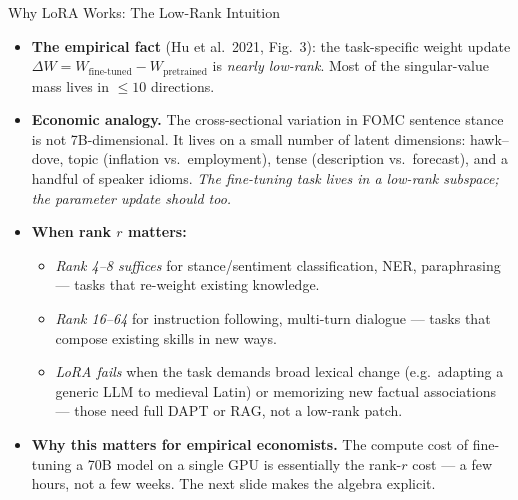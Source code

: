 \begin{frame}{Why LoRA Works: The Low-Rank Intuition}
\begin{itemize}
\item \textbf{The empirical fact} (Hu et al.\ 2021, Fig.\ 3): the task-specific weight update $\Delta W = W_{\text{fine-tuned}} - W_{\text{pretrained}}$ is \emph{nearly low-rank}. Most of the singular-value mass lives in $\le 10$ directions.

\medskip
\item \textbf{Economic analogy.} The cross-sectional variation in FOMC sentence stance is not 7B-dimensional. It lives on a small number of latent dimensions: hawk--dove, topic (inflation vs.\ employment), tense (description vs.\ forecast), and a handful of speaker idioms. \emph{The fine-tuning task lives in a low-rank subspace; the parameter update should too.}

\medskip
\item \textbf{When rank $r$ matters:}
\begin{itemize}
    \item \emph{Rank 4--8 suffices} for stance/sentiment classification, NER, paraphrasing --- tasks that re-weight existing knowledge.
    \item \emph{Rank 16--64} for instruction following, multi-turn dialogue --- tasks that compose existing skills in new ways.
    \item \emph{LoRA fails} when the task demands broad lexical change (e.g.\ adapting a generic LLM to medieval Latin) or memorizing new factual associations --- those need full DAPT or RAG, not a low-rank patch.
\end{itemize}

\medskip
\item \textbf{Why this matters for empirical economists.} The compute cost of fine-tuning a 70B model on a single GPU is essentially the rank-$r$ cost --- a few hours, not a few weeks. The next slide makes the algebra explicit.
\end{itemize}
\end{frame}

